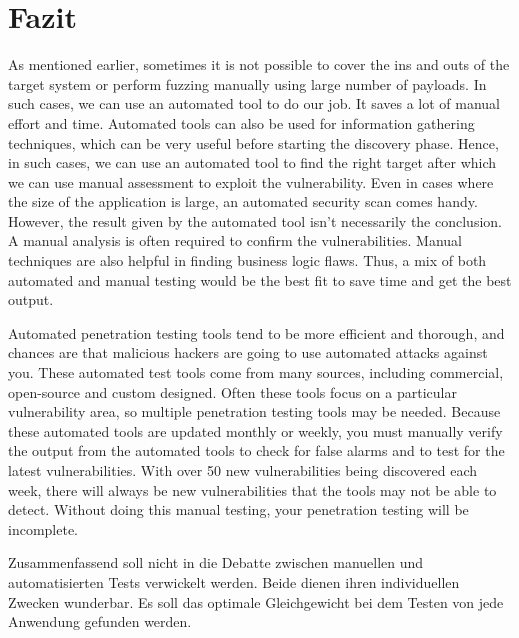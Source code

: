 \chapter{Fazit}
\label{cha:k7}


As mentioned earlier, sometimes it is not possible to cover the ins and outs of the target system or perform fuzzing manually using large number of payloads. In such cases, we can use an automated tool to do our job. It saves a lot of manual effort and time.
Automated tools can also be used for information gathering techniques, which can be very useful before starting the discovery phase. Hence, in such cases, we can use an automated tool to find the right target after which we can use manual assessment to exploit the vulnerability. Even in cases where the size of the application is large, an automated security scan comes handy. However, the result given by the automated tool isn’t necessarily the conclusion. A manual analysis is often required to confirm the vulnerabilities. Manual techniques are also helpful in finding business logic flaws. Thus, a mix of both automated and manual testing would be the best fit to save time and get the best output.



Automated penetration testing tools tend to be more efficient and thorough, and chances are that malicious hackers are going to use automated attacks against you. These automated test tools come from many sources, including commercial, open-source and custom designed. Often these tools focus on a particular vulnerability area, so multiple penetration testing tools may be needed. Because these automated tools are updated monthly or weekly, you must manually verify the output from the automated tools to check for false alarms and to test for the latest vulnerabilities. With over 50 new vulnerabilities being discovered each week, there will always be new vulnerabilities that the tools may not be able to detect. Without doing this manual testing, your penetration testing will be incomplete. 

Zusammenfassend soll nicht in die Debatte zwischen manuellen und automatisierten Tests verwickelt werden. Beide dienen ihren individuellen Zwecken wunderbar. Es soll das optimale Gleichgewicht bei dem Testen von jede Anwendung gefunden werden.


